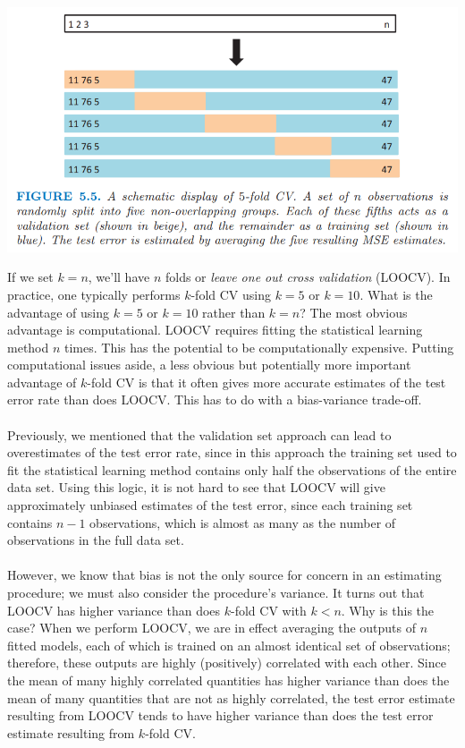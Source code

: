 \begin{center}
    \includegraphics[scale=0.7]{images/k-fold-cv.png}
\end{center}
If we set $k=n$, we'll have $n$ folds or \textit{leave one out cross validation} (LOOCV).  In practice, one typically performs $k$-fold CV using $k = 5$ or $k = 10$. What is the advantage of using $k = 5$ or $k = 10$ rather than $k = n$? The most obvious advantage is computational. LOOCV requires fitting the statistical learning method $n$ times. This has the potential to be computationally expensive.  Putting computational issues aside, a less obvious but potentially more important advantage of $k$-fold CV is that it often gives more accurate estimates of the test error rate than does LOOCV. This has to do with a bias-variance trade-off.\\\\
Previously, we mentioned that the validation set approach can
lead to overestimates of the test error rate, since in this approach the training set used to fit the statistical learning method contains only half the observations of the entire data set. Using this logic, it is not hard to see that LOOCV will give approximately unbiased estimates of the test error, since each training set contains $n - 1$ observations, which is almost as many as the number of observations in the full data set.\\\\
However, we know that bias is not the only source for concern in an estimating procedure; we must also consider the procedure’s variance. It turns out that LOOCV has higher variance than does $k$-fold CV with $k<n$. Why is this the case? When we perform LOOCV, we are in effect averaging the outputs of $n$ fitted models, each of which is trained on an almost identical set of observations; therefore, these outputs are highly (positively) correlated with each other. Since the mean of many highly correlated quantities has higher variance than does the mean of many quantities that are not as highly correlated, the test error estimate resulting from LOOCV tends to have higher variance than does the test error estimate resulting from $k$-fold CV.\\\\

